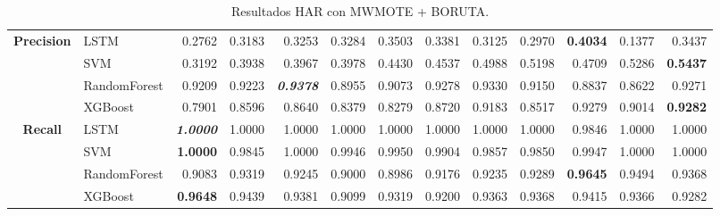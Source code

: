\begin{table}[H]
\begin{adjustbox}{max width=14cm}
\begin{tabular}{|c|l|r|r|r|r|r|r|r|r|r|r|r|}
			\hline
			\textbf{Precision} &  LSTM &  0.2762 &  0.3183 &  0.3253 &  0.3284 &  0.3503 &  0.3381 &  0.3125 &  0.2970 & \textbf{  0.4034 } &  0.1377 &  0.3437 \\
			&  SVM &  0.3192 &  0.3938 &  0.3967 &  0.3978 &  0.4430 &  0.4537 &  0.4988 &  0.5198 &  0.4709 &  0.5286 & \textbf{  0.5437 } \\
			&  RandomForest &  0.9209 &  0.9223 & \textit{ \textbf{  0.9378 } } &  0.8955 &  0.9073 &  0.9278 &  0.9330 &  0.9150 &  0.8837 &  0.8622 &  0.9271 \\
			&  XGBoost &  0.7901 &  0.8596 &  0.8640 &  0.8379 &  0.8279 &  0.8720 &  0.9183 &  0.8517 &  0.9279 &  0.9014 & \textbf{  0.9282 } \\
			\hline
			\textbf{Recall} &  LSTM & \textit{ \textbf{  1.0000 } } &  1.0000 &  1.0000 &  1.0000 &  1.0000 &  1.0000 &  1.0000 &  1.0000 &  0.9846 &  1.0000 &  1.0000 \\
			&  SVM & \textbf{  1.0000 } &  0.9845 &  1.0000 &  0.9946 &  0.9950 &  0.9904 &  0.9857 &  0.9850 &  0.9947 &  1.0000 &  1.0000 \\
			&  RandomForest &  0.9083 &  0.9319 &  0.9245 &  0.9000 &  0.8986 &  0.9176 &  0.9235 &  0.9289 & \textbf{  0.9645 } &  0.9494 &  0.9368 \\
			&  XGBoost & \textbf{  0.9648 } &  0.9439 &  0.9381 &  0.9099 &  0.9319 &  0.9200 &  0.9363 &  0.9368 &  0.9415 &  0.9366 &  0.9282 \\
			\hline
		\end{tabular}
	\end{adjustbox}
	\caption{Resultados HAR con MWMOTE + BORUTA.}
	\label{tab:HAR_MWMOTE_BORUTA}
\end{table}
